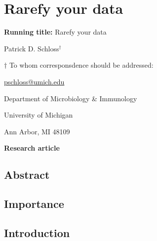 \documentclass[
]{article}
\author{}
\date{\vspace{-2.5em}}
\begin{document}
\hypertarget{rarefy-your-data}{%
\section{Rarefy your data}\label{rarefy-your-data}}

\vspace{20mm}

\textbf{Running title:} Rarefy your data

\vspace{20mm}

Patrick D. Schloss\({^\dagger}\)

\vspace{40mm}

\({\dagger}\) To whom corresponsdence should be addressed:

\href{mailto:pschloss@umich.edu}{pschloss@umich.edu}

Department of Microbiology \& Immunology

University of Michigan

Ann Arbor, MI 48109

\vspace{20mm}

\textbf{Research article}

\newpage

\hypertarget{abstract}{%
\subsection{Abstract}\label{abstract}}

\hypertarget{importance}{%
\subsection{Importance}\label{importance}}

\newpage

\hypertarget{introduction}{%
\subsection{Introduction}\label{introduction}}
\end{document}
